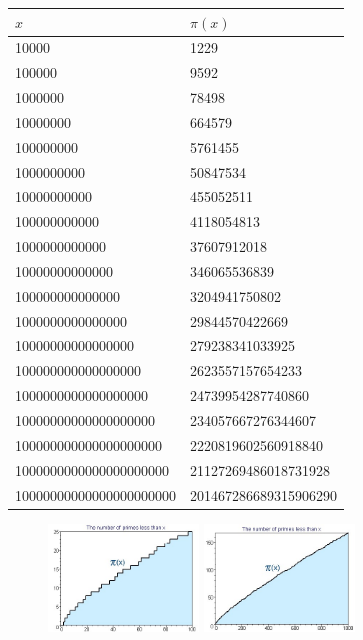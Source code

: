 \documentclass[landscape,display]{powersem} %
\newcommand{\heading}[1]{%
 \begin{center}
  \large\bf
  \shadowbox{{\textcolor{conceptcolor}{#1}}}%
 \end{center}
 \vspace{1ex minus 1ex}}
\begin{document}
\begin{slide}

\begin{minipage}[l]{7cm}
\begin{scriptsize}
\begin{tabular}{|l|l|}
  \hline
     $x$ & $\pi(x)$\\
\hline
10000 & 1229\\
100000  &   9592\\
1000000  & 78498\\
10000000 & 664579\\
100000000 &    5761455\\
1000000000&   50847534\\
10000000000&  455052511\\
100000000000&     4118054813\\
1000000000000&   37607912018\\
10000000000000&  346065536839\\
100000000000000 & 3204941750802\\
1000000000000000 &29844570422669\\
10000000000000000 &279238341033925\\
100000000000000000 &2623557157654233\\
1000000000000000000 &24739954287740860\\
10000000000000000000 &234057667276344607\\
100000000000000000000 & 2220819602560918840 \\
1000000000000000000000 & 21127269486018731928 \\
10000000000000000000000 & 201467286689315906290\\
\hline
\end{tabular}
\end{scriptsize}
\end{minipage}
\begin{minipage}[r]{4.5cm}
\heading{The plot of $\pi(x)$}
\begin{figure}
\includegraphics[width=4cm]{images/pi100.jpg}
\hspace{1cm} \includegraphics[width=4cm]{images/pi1000.jpg}
 \end{figure}\end{minipage}
\end{slide}            
\end{document}
